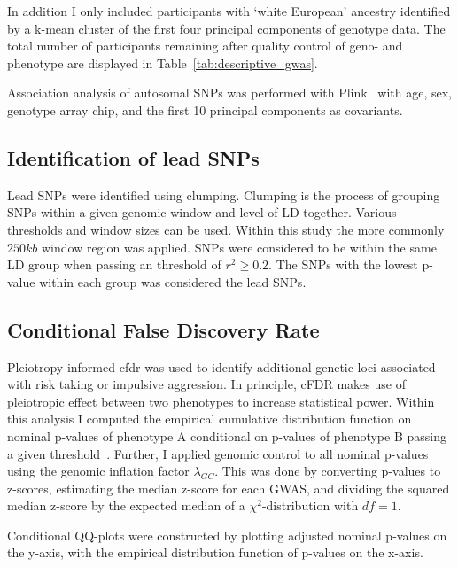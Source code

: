 In addition I only included participants with `white European' ancestry identified by a k-mean cluster of the first four principal components of genotype data.
The total number of participants remaining after quality control of geno- and phenotype are displayed in Table~\ref{tab:descriptive_gwas}.

Association analysis of autosomal SNPs was performed with Plink~\cite{Purcell2007,Chang2015} with age, sex, genotype array chip, and the first 10 principal components as covariants.

\subsection{Identification of lead SNPs}
\label{sub:Clumping}

Lead SNPs were identified using clumping.
Clumping is the process of grouping SNPs within a given genomic window and level of LD together.
Various thresholds and window sizes can be used.
Within this study the more commonly $250kb$ window region was applied.
SNPs were considered to be within the same LD group when passing an threshold of $r^2 \ge 0.2$.
The SNPs with the lowest p-value within each group was considered the lead SNPs.

\subsection{Conditional False Discovery Rate}
\label{sub:conditional_false_discovery_rate}

Pleiotropy informed \acrfull{cfdr} was used to identify additional genetic loci associated with risk taking or impulsive aggression. 
In principle, cFDR makes use of pleiotropic effect between two phenotypes to increase statistical power.
Within this analysis I computed the empirical cumulative distribution function on nominal p-values of phenotype A conditional on p-values of phenotype B passing a given threshold~\cite{Andreassen2013}.
Further, I applied genomic control to all nominal p-values using the genomic inflation factor $\lambda_{GC}$.
This was done by converting p-values to z-scores, estimating the median z-score for each GWAS, and dividing the squared median z-score by the expected median of a $\chi^2$-distribution  with $df=1$.

Conditional QQ-plots were constructed by plotting adjusted nominal p-values on the y-axis, with the empirical distribution function of p-values on the x-axis.

